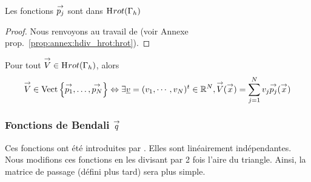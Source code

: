       \begin{prop}
        Les fonctions \({\overset{\rightarrow}{p_j}}\) sont dans \(\mathrm{H}_\mathrm{{}}{rot}(\Gamma_h)\)
      \end{prop}
      \begin{proof}
        Nous renvoyons au travail de \cite{nedelec_mixed_1980} (voir Annexe prop.~\ref{prop:annex:hdiv_hrot:hrot}).
      \end{proof}


      \begin{defn}
        Pour tout \({\overset{\rightarrow}{V}} \in \mathrm{H}_\mathrm{{}}{rot}(\Gamma_h)\), alors 
        \begin{equation*}
          {\overset{\rightarrow}{V}} \in \operatorname{Vect}\left\lbrace{\overset{\rightarrow}{p_1}},\ldots,{\overset{\rightarrow}{p_N}}\right\rbrace \Leftrightarrow \exists {\underline{v}} = (v_1,\cdots,v_N)^t \in \mathbb R^N, {\overset{\rightarrow}{V}}({\overset{\rightarrow}{x}}) = \sum_{j=1}^N v_j {\overset{\rightarrow}{p_j}}({\overset{\rightarrow}{x}})
        \end{equation*}
      \end{defn}

    \subsubsection[Fonctions de Bendali q]{Fonctions de Bendali \({\overset{\rightarrow}{q}}\)}

      Ces fonctions ont été introduites par \cite[eq.~28]{bendali_boundary-element_1999}. Elles sont linéairement indépendantes. Nous modifions ces fonctions en les divisant par 2 fois l'aire du triangle. Ainsi, la matrice de passage (défini plus tard) sera plus simple.

